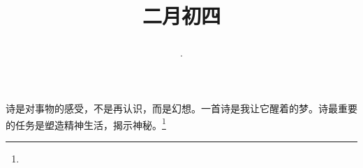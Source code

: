 \title{\date[d=13,m=3,y=2024][year:cn-y,年,month:cn,day:cn,日,·,weekday]·二月初四 }
诗是对事物的感受，不是再认识，而是幻想。一首诗是我让它醒着的梦。诗最重要的任务是塑造精神生活，揭示神秘。\footnote{ }

